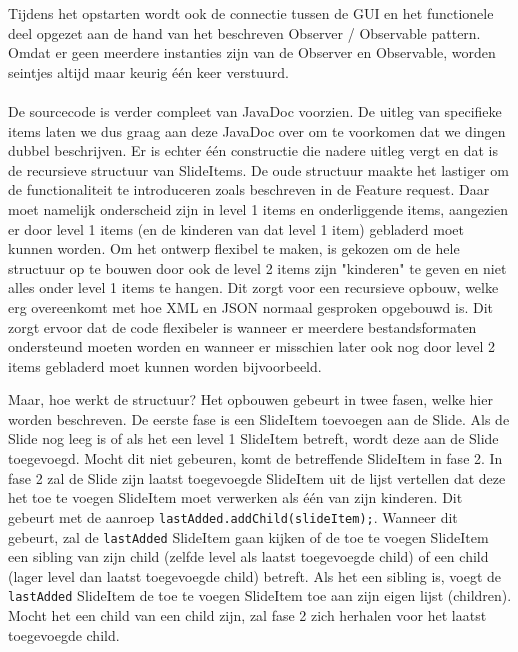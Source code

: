 \documentclass[a4paper]{article}
\newcommand{\1}[0]{\'{e}\'{e}n}
\newcommand{\code}[1]{\texttt{#1}}
\begin{document}
Tijdens het opstarten wordt ook de connectie tussen de GUI en het functionele deel opgezet aan de hand van het beschreven Observer / Observable pattern. Omdat er geen meerdere instanties zijn van de Observer en Observable, worden seintjes altijd maar keurig \1 keer verstuurd.
\\\\
De sourcecode is verder compleet van JavaDoc voorzien. De uitleg van specifieke items laten we dus graag aan deze JavaDoc over om te voorkomen dat we dingen dubbel beschrijven. Er is echter \1 constructie die nadere uitleg vergt en dat is de recursieve structuur van SlideItems. De oude structuur maakte het lastiger om de functionaliteit te introduceren zoals beschreven in de Feature request. Daar moet namelijk onderscheid zijn in level 1 items en onderliggende items, aangezien er door level 1 items (en de kinderen van dat level 1 item) gebladerd moet kunnen worden. Om het ontwerp flexibel te maken, is gekozen om de hele structuur op te bouwen door ook de level 2 items zijn "kinderen" te geven en niet alles onder level 1 items te hangen. Dit zorgt voor een recursieve opbouw, welke erg overeenkomt met hoe XML en JSON normaal gesproken opgebouwd is. Dit zorgt ervoor dat de code flexibeler is wanneer er meerdere bestandsformaten ondersteund moeten worden en wanneer er misschien later ook nog door level 2 items gebladerd moet kunnen worden bijvoorbeeld.

Maar, hoe werkt de structuur? Het opbouwen gebeurt in twee fasen, welke hier worden beschreven. De eerste fase is een SlideItem toevoegen aan de Slide. Als de Slide nog leeg is of als het een level 1 SlideItem betreft, wordt deze aan de Slide toegevoegd. Mocht dit niet gebeuren, komt de betreffende SlideItem in fase 2. In fase 2 zal de Slide zijn laatst toegevoegde SlideItem uit de lijst vertellen dat deze het toe te voegen SlideItem moet verwerken als \1 van zijn kinderen. Dit gebeurt met de aanroep \code{lastAdded.addChild(slideItem);}. Wanneer dit gebeurt, zal de \code{lastAdded} SlideItem gaan kijken of de toe te voegen SlideItem een sibling van zijn child (zelfde level als laatst toegevoegde child) of een child (lager level dan laatst toegevoegde child) betreft. Als het een sibling is, voegt de \code{lastAdded} SlideItem de toe te voegen SlideItem toe aan zijn eigen lijst (children). Mocht het een child van een child zijn, zal fase 2 zich herhalen voor het laatst toegevoegde child.
\end{document}
